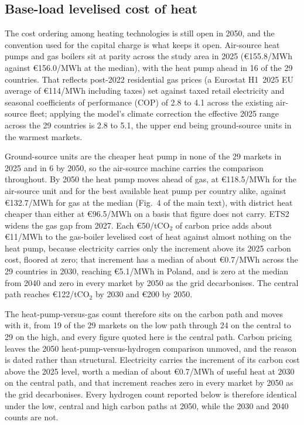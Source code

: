 \subsection{Base-load levelised cost of heat}
\label{sec:results:lcoh}

The cost ordering among heating technologies is still open in 2050, and the convention
used for the capital charge is what keeps it open. Air-source heat pumps and gas boilers
sit at parity across the study area in 2025 (\euro{}155.8/MWh against \euro{}156.0/MWh
at the median), with the heat pump ahead in 16 of the 29 countries. That reflects
post-2022 residential gas prices (a Eurostat H1~2025 EU average of \euro{}114/MWh
including taxes) set against taxed retail electricity and seasonal coefficients of
performance (COP) of 2.8 to 4.1 across the existing air-source fleet; applying
the model's climate correction the effective 2025 range across the 29 countries is 2.8
to 5.1, the upper end being ground-source units in the warmest markets.

Ground-source units are the cheaper heat pump in none of the 29 markets in 2025 and in 6
by 2050, so the air-source machine carries the comparison throughout. By 2050 the heat
pump moves ahead of gas, at \euro{}118.5/MWh for the air-source unit and for the best
available heat pump per country alike, against \euro{}132.7/MWh for gas at the median
(Fig.~4 of the main text), with district heat cheaper than either at
\euro{}96.5/MWh on a basis that figure does not carry.
ETS2 widens the gas gap from 2027. Each \euro{}50/tCO$_2$ of carbon price adds about
\euro{}11/MWh to the gas-boiler levelised cost of heat against almost nothing on
the heat pump, because electricity carries only the increment above its 2025 carbon
cost, floored at zero; that increment has a median of about \euro{}0.7/MWh across the 29 countries in 2030,
reaching \euro{}5.1/MWh in Poland, and is zero at the median from 2040 and zero in every
market by 2050 as the grid decarbonises. The central path reaches \euro{}122/tCO$_2$ by 2030 and
\euro{}200 by 2050.

The heat-pump-versus-gas count therefore sits on the carbon path
and moves with it, from 19 of the 29 markets on the low path through 24 on the central
to 29 on the high, and every figure quoted here is the central path. Carbon pricing leaves the 2050 heat-pump-versus-hydrogen comparison unmoved, and the
reason is dated rather than structural. Electricity carries the increment of its carbon cost
above the 2025 level, worth a median of about \euro{}0.7/MWh of useful heat at 2030 on the
central path, and that increment reaches zero in every market by 2050 as the grid
decarbonises. Every
hydrogen count reported below is therefore identical under the low, central and high
carbon paths at 2050, while the 2030 and 2040 counts are not.

